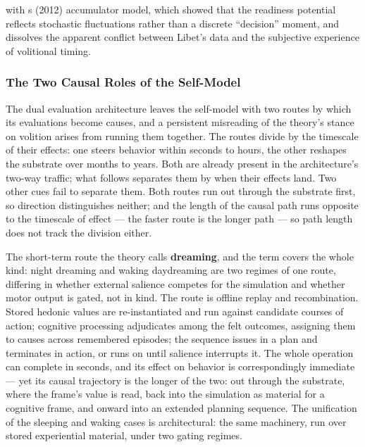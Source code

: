 \documentclass[12pt]{article}
\newcommand{\revstart}{}
\begin{document}
with \citeauthor{Schurger2012}\textquotesingle s (2012) accumulator model, which showed that the readiness potential reflects stochastic fluctuations rather than a discrete ``decision'' moment, and dissolves the apparent conflict between Libet's data and the subjective experience of volitional timing.


\subsubsection{The Two Causal Roles of the Self-Model}

{\revstart The dual evaluation architecture leaves the self-model with two routes by which its evaluations become causes, and a persistent misreading of the theory's stance on volition arises from running them together. The routes divide by the timescale of their effects: one steers behavior within seconds to hours, the other reshapes the substrate over months to years. Both are already present in the architecture's two-way traffic; what follows separates them by when their effects land. Two other cues fail to separate them. Both routes run out through the substrate first, so direction distinguishes neither; and the length of the causal path runs opposite to the timescale of effect --- the faster route is the longer path --- so path length does not track the division either.

The short-term route the theory calls \textbf{dreaming}, and the term covers the whole kind: night dreaming and waking daydreaming are two regimes of one route, differing in whether external salience competes for the simulation and whether motor output is gated, not in kind. The route is offline replay and recombination. Stored hedonic values are re-instantiated and run against candidate courses of action; cognitive processing adjudicates among the felt outcomes, assigning them to causes across remembered episodes; the sequence issues in a plan and terminates in action, or runs on until salience interrupts it. The whole operation can complete in seconds, and its effect on behavior is correspondingly immediate --- yet its causal trajectory is the longer of the two: out through the substrate, where the frame's value is read, back into the simulation as material for a cognitive frame, and onward into an extended planning sequence. The unification of the sleeping and waking cases is architectural: the same machinery, run over stored experiential material, under two gating regimes.

}
\end{document}
